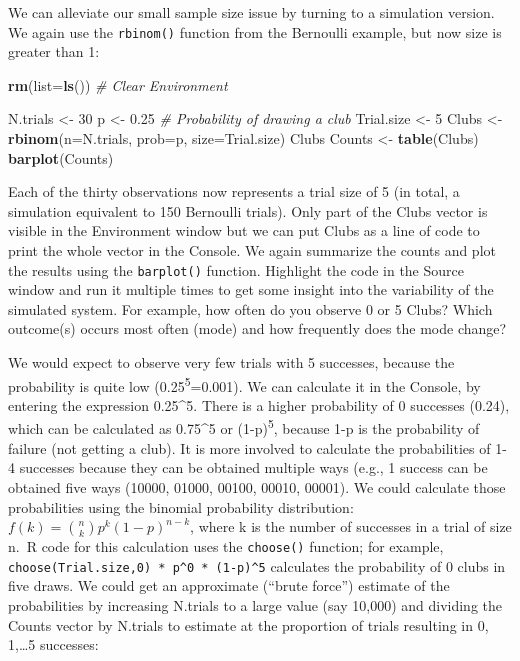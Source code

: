 \documentclass[
]{krantz}
\makeatletter
\newenvironment{Shaded}{\begin{snugshade}}{\end{snugshade}}
\newcommand{\AttributeTok}[1]{\textcolor[rgb]{0.27,0.27,0.27}{#1}}
\newcommand{\CommentTok}[1]{\textcolor[rgb]{0.37,0.37,0.37}{\textit{#1}}}
\newcommand{\DecValTok}[1]{\textcolor[rgb]{0.06,0.06,0.06}{#1}}
\newcommand{\FloatTok}[1]{\textcolor[rgb]{0.06,0.06,0.06}{#1}}
\newcommand{\FunctionTok}[1]{\textcolor[rgb]{0.27,0.27,0.27}{\textbf{#1}}}
\newcommand{\NormalTok}[1]{#1}
\newcommand{\OtherTok}[1]{\textcolor[rgb]{0.37,0.37,0.37}{#1}}
\newenvironment{kframe}{%
\medskip{}
\setlength{\fboxsep}{.8em}
 \def\at@end@of@kframe{}%
 \ifinner\ifhmode%
  \def\at@end@of@kframe{\end{minipage}}%
  \begin{minipage}{\columnwidth}%
 \fi\fi%
 \def\FrameCommand##1{\hskip\@totalleftmargin \hskip-\fboxsep
 \colorbox{shadecolor}{##1}\hskip-\fboxsep
     \hskip-\linewidth \hskip-\@totalleftmargin \hskip\columnwidth}%
 \MakeFramed {\advance\hsize-\width
   \@totalleftmargin\z@ \linewidth\hsize
   \@setminipage}}%
 {\par\unskip\endMakeFramed%
 \at@end@of@kframe}
\renewenvironment{Shaded}{\begin{kframe}}{\end{kframe}}
\makeatother
\begin{document}
We can alleviate our small sample size issue by turning to a simulation version. We again use the \texttt{rbinom()} function from the Bernoulli example, but now size is greater than 1:

\begin{Shaded}
\begin{Highlighting}[]
\FunctionTok{rm}\NormalTok{(}\AttributeTok{list=}\FunctionTok{ls}\NormalTok{()) }\CommentTok{\# Clear Environment}

\NormalTok{N.trials }\OtherTok{\textless{}{-}} \DecValTok{30}
\NormalTok{p }\OtherTok{\textless{}{-}} \FloatTok{0.25} \CommentTok{\# Probability of drawing a club}
\NormalTok{Trial.size }\OtherTok{\textless{}{-}} \DecValTok{5}
\NormalTok{Clubs }\OtherTok{\textless{}{-}} \FunctionTok{rbinom}\NormalTok{(}\AttributeTok{n=}\NormalTok{N.trials, }\AttributeTok{prob=}\NormalTok{p, }\AttributeTok{size=}\NormalTok{Trial.size)}
\NormalTok{Clubs}
\NormalTok{Counts }\OtherTok{\textless{}{-}} \FunctionTok{table}\NormalTok{(Clubs)}
\FunctionTok{barplot}\NormalTok{(Counts)}
\end{Highlighting}
\end{Shaded}

Each of the thirty observations now represents a trial size of 5 (in total, a simulation equivalent to 150 Bernoulli trials). Only part of the Clubs vector is visible in the Environment window but we can put Clubs as a line of code to print the whole vector in the Console. We again summarize the counts and plot the results using the \texttt{barplot()} function. Highlight the code in the Source window and run it multiple times to get some insight into the variability of the simulated system. For example, how often do you observe 0 or 5 Clubs? Which outcome(s) occurs most often (mode) and how frequently does the mode change?

We would expect to observe very few trials with 5 successes, because the probability is quite low (0.25\textsuperscript{5}=0.001). We can calculate it in the Console, by entering the expression 0.25\^{}5. There is a higher probability of 0 successes (0.24), which can be calculated as 0.75\^{}5 or (1-p)\textsuperscript{5}, because 1-p is the probability of failure (not getting a club). It is more involved to calculate the probabilities of 1-4 successes because they can be obtained multiple ways (e.g., 1 success can be obtained five ways (10000, 01000, 00100, 00010, 00001). We could calculate those probabilities using the binomial probability distribution: \(f(k) = {n \choose k} p^{k} (1-p)^{n-k}\), where k is the number of successes in a trial of size n.~R code for this calculation uses the \texttt{choose()} function; for example, \texttt{choose(Trial.size,0)\ *\ p\^{}0\ *\ (1-p)\^{}5} calculates the probability of 0 clubs in five draws. We could get an approximate (``brute force'') estimate of the probabilities by increasing N.trials to a large value (say 10,000) and dividing the Counts vector by N.trials to estimate at the proportion of trials resulting in 0, 1,\ldots5 successes:
\end{document}
